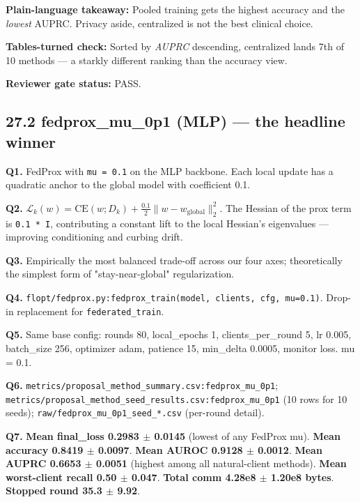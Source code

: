 \documentclass{article}
\begin{document}
\textbf{Plain-language takeaway:} Pooled training gets the highest accuracy and the \emph{lowest} AUPRC. Privacy aside, centralized is not the best clinical choice.


\textbf{Tables-turned check:} Sorted by \emph{AUPRC} descending, centralized lands 7th of 10 methods --- a starkly different ranking than the accuracy view.


\textbf{Reviewer gate status:} PASS.


\subsection{27.2 fedprox\_mu\_0p1 (MLP) --- the headline winner}


\textbf{Q1.} FedProx with \texttt{mu = 0.1} on the MLP backbone. Each local update has a quadratic anchor to the global model with coefficient 0.1.


\textbf{Q2.} \(\mathcal{L}_k(w) = \text{CE}(w; D_k) + \frac{0.1}{2} \|w - w_{\text{global}}\|_2^2\). The Hessian of the prox term is \texttt{0.1 * I}, contributing a constant lift to the local Hessian's eigenvalues --- improving conditioning and curbing drift.


\textbf{Q3.} Empirically the most balanced trade-off across our four axes; theoretically the simplest form of "stay-near-global" regularization.


\textbf{Q4.} \texttt{flopt/fedprox.py:fedprox\_train(model, clients, cfg, mu=0.1)}. Drop-in replacement for \texttt{federated\_train}.


\textbf{Q5.} Same base config: rounds 80, local\_epochs 1, clients\_per\_round 5, lr 0.005, batch\_size 256, optimizer adam, patience 15, min\_delta 0.0005, monitor loss. mu = 0.1.


\textbf{Q6.} \texttt{metrics/proposal\_method\_summary.csv:fedprox\_mu\_0p1}; \texttt{metrics/proposal\_method\_seed\_results.csv:fedprox\_mu\_0p1} (10 rows for 10 seeds); \texttt{raw/fedprox\_mu\_0p1\_seed\_*.csv} (per-round detail).


\textbf{Q7.} \textbf{Mean final\_loss 0.2983 \ensuremath{\pm} 0.0145} (lowest of any FedProx mu). \textbf{Mean accuracy 0.8419 \ensuremath{\pm} 0.0097}. \textbf{Mean AUROC 0.9128 \ensuremath{\pm} 0.0012}. \textbf{Mean AUPRC 0.6653 \ensuremath{\pm} 0.0051} (highest among all natural-client methods). \textbf{Mean worst-client recall 0.50 \ensuremath{\pm} 0.047}. \textbf{Total comm 4.28e8 \ensuremath{\pm} 1.20e8 bytes}. \textbf{Stopped round 35.3 \ensuremath{\pm} 9.92}.
\end{document}
